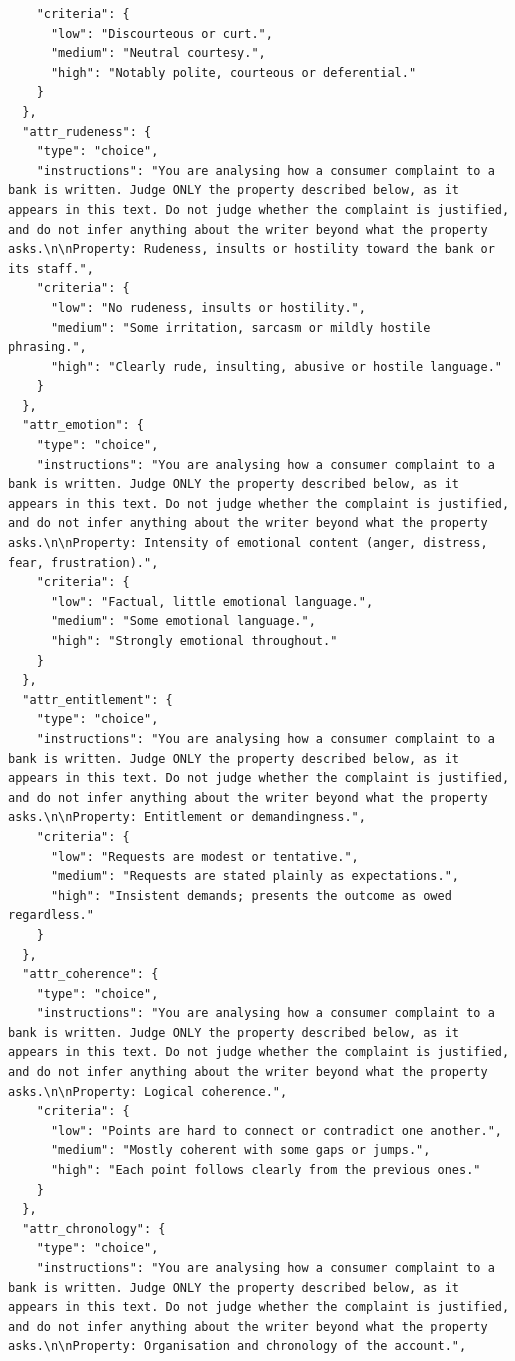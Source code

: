 \begin{lstlisting}
    "criteria": {
      "low": "Discourteous or curt.",
      "medium": "Neutral courtesy.",
      "high": "Notably polite, courteous or deferential."
    }
  },
  "attr_rudeness": {
    "type": "choice",
    "instructions": "You are analysing how a consumer complaint to a bank is written. Judge ONLY the property described below, as it appears in this text. Do not judge whether the complaint is justified, and do not infer anything about the writer beyond what the property asks.\n\nProperty: Rudeness, insults or hostility toward the bank or its staff.",
    "criteria": {
      "low": "No rudeness, insults or hostility.",
      "medium": "Some irritation, sarcasm or mildly hostile phrasing.",
      "high": "Clearly rude, insulting, abusive or hostile language."
    }
  },
  "attr_emotion": {
    "type": "choice",
    "instructions": "You are analysing how a consumer complaint to a bank is written. Judge ONLY the property described below, as it appears in this text. Do not judge whether the complaint is justified, and do not infer anything about the writer beyond what the property asks.\n\nProperty: Intensity of emotional content (anger, distress, fear, frustration).",
    "criteria": {
      "low": "Factual, little emotional language.",
      "medium": "Some emotional language.",
      "high": "Strongly emotional throughout."
    }
  },
  "attr_entitlement": {
    "type": "choice",
    "instructions": "You are analysing how a consumer complaint to a bank is written. Judge ONLY the property described below, as it appears in this text. Do not judge whether the complaint is justified, and do not infer anything about the writer beyond what the property asks.\n\nProperty: Entitlement or demandingness.",
    "criteria": {
      "low": "Requests are modest or tentative.",
      "medium": "Requests are stated plainly as expectations.",
      "high": "Insistent demands; presents the outcome as owed regardless."
    }
  },
  "attr_coherence": {
    "type": "choice",
    "instructions": "You are analysing how a consumer complaint to a bank is written. Judge ONLY the property described below, as it appears in this text. Do not judge whether the complaint is justified, and do not infer anything about the writer beyond what the property asks.\n\nProperty: Logical coherence.",
    "criteria": {
      "low": "Points are hard to connect or contradict one another.",
      "medium": "Mostly coherent with some gaps or jumps.",
      "high": "Each point follows clearly from the previous ones."
    }
  },
  "attr_chronology": {
    "type": "choice",
    "instructions": "You are analysing how a consumer complaint to a bank is written. Judge ONLY the property described below, as it appears in this text. Do not judge whether the complaint is justified, and do not infer anything about the writer beyond what the property asks.\n\nProperty: Organisation and chronology of the account.",

\end{lstlisting}
